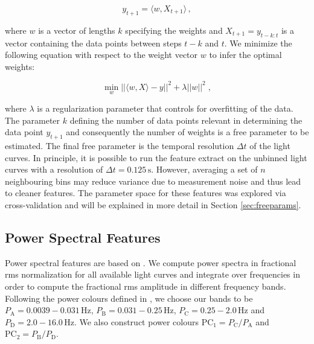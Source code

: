 \documentclass[12pt]{emulateapj}
\begin{document}
\begin{equation}
y_{t+1} = \langle w, X_{t+1} \rangle \, ,
\end{equation}

\noindent  where $w$ is a vector of lengths $k$ specifying the weights and $X_{t+1} = y_{t-k:t}$ is a vector containing the data points between steps $t-k$ and $t$.
We minimize the following equation with respect to the weight vector $w$ to infer the optimal weights:

\begin{equation}
\min_w ||\langle w, X \rangle - y||^2 + \lambda ||w||^2 \; ,
\end{equation}

\noindent where $\lambda$ is a regularization parameter that controls for overfitting of the data. The parameter $k$ defining the number of data points relevant in determining the data point $y_{t+1}$ and consequently the number of weights is a free parameter to be estimated. The final free parameter is the temporal resolution $\Delta t$ of the light curves. In principle, it is possible to run the feature extract on the unbinned light curves with a resolution of $\Delta t = 0.125\,\mathrm{s}$. However, averaging  a set of $n$ neighbouring bins may reduce variance due to measurement noise and thus lead to cleaner features. The parameter space for these features was explored via cross-validation and will be explained in more detail in Section \ref{sec:freeparams}.


\subsection{Power Spectral Features}

Power spectral features are based on \citep{heil2015}. We compute power spectra in fractional rms normalization for all available light curves and integrate over frequencies in order to compute the fractional rms amplitude in different frequency bands. 
Following the power colours defined in \citet{heil2015}, we choose our bands to be $P_\mathrm{A} = 0.0039-0.031 \,\mathrm{Hz}$, 
$P_\mathrm{B} = 0.031-0.25 \,\mathrm{Hz}$, $P_\mathrm{C} =  0.25-2.0 \,\mathrm{Hz}$ and $P_\mathrm{D} = 2.0-16.0 \,\mathrm{Hz}$. We also construct power colours $\mathrm{PC}_1 = P_\mathrm{C}/P_\mathrm{A}$ and  $\mathrm{PC}_2 = P_\mathrm{B}/P_\mathrm{D}$.
\end{document}
